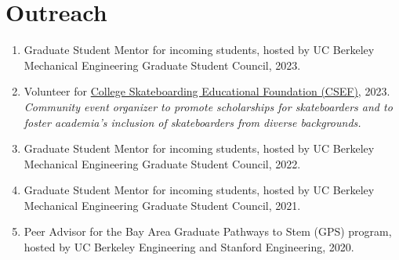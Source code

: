 \documentclass[11pt]{article}
\begin{document}
	\section{Outreach}
	\begin{enumerate}[label={\arabic*.}]
		\item Graduate Student Mentor for incoming students, hosted by UC Berkeley Mechanical Engineering Graduate Student Council, 2023.
		\item Volunteer for \href{https://www.collegeskateboarding.com/}{College Skateboarding Educational Foundation (CSEF)}, 2023. \\
		\textit{Community event organizer to promote scholarships for skateboarders and to foster academia's inclusion of skateboarders from diverse backgrounds.}
		\item Graduate Student Mentor for incoming students, hosted by UC Berkeley Mechanical Engineering Graduate Student Council, 2022.
		\item Graduate Student Mentor for incoming students, hosted by UC Berkeley Mechanical Engineering Graduate Student Council, 2021.
		\item Peer Advisor for the Bay Area Graduate Pathways to Stem (GPS) program, hosted by UC Berkeley Engineering and Stanford Engineering, 2020.
	\end{enumerate}
	
\end{document}
